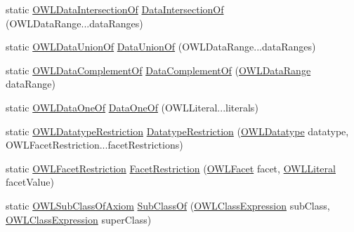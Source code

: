 \begin{DoxyCompactItemize}
\item 
static \hyperlink{interfaceorg_1_1semanticweb_1_1owlapi_1_1model_1_1_o_w_l_data_intersection_of}{O\-W\-L\-Data\-Intersection\-Of} \hyperlink{classorg_1_1semanticweb_1_1owlapi_1_1apibinding_1_1_o_w_l_functional_syntax_factory_a493de259f7d18b8dd7bca58a6ebdad9f}{Data\-Intersection\-Of} (O\-W\-L\-Data\-Range...\-data\-Ranges)
\item 
static \hyperlink{interfaceorg_1_1semanticweb_1_1owlapi_1_1model_1_1_o_w_l_data_union_of}{O\-W\-L\-Data\-Union\-Of} \hyperlink{classorg_1_1semanticweb_1_1owlapi_1_1apibinding_1_1_o_w_l_functional_syntax_factory_abc99421cbe3ad765083e770ebb2152b0}{Data\-Union\-Of} (O\-W\-L\-Data\-Range...\-data\-Ranges)
\item 
static \hyperlink{interfaceorg_1_1semanticweb_1_1owlapi_1_1model_1_1_o_w_l_data_complement_of}{O\-W\-L\-Data\-Complement\-Of} \hyperlink{classorg_1_1semanticweb_1_1owlapi_1_1apibinding_1_1_o_w_l_functional_syntax_factory_a6bcff4150be502475cc7f6391a4bba3e}{Data\-Complement\-Of} (\hyperlink{interfaceorg_1_1semanticweb_1_1owlapi_1_1model_1_1_o_w_l_data_range}{O\-W\-L\-Data\-Range} data\-Range)
\item 
static \hyperlink{interfaceorg_1_1semanticweb_1_1owlapi_1_1model_1_1_o_w_l_data_one_of}{O\-W\-L\-Data\-One\-Of} \hyperlink{classorg_1_1semanticweb_1_1owlapi_1_1apibinding_1_1_o_w_l_functional_syntax_factory_a4fec013de9e968c4f7f9b9556fee89d9}{Data\-One\-Of} (O\-W\-L\-Literal...\-literals)
\item 
static \hyperlink{interfaceorg_1_1semanticweb_1_1owlapi_1_1model_1_1_o_w_l_datatype_restriction}{O\-W\-L\-Datatype\-Restriction} \hyperlink{classorg_1_1semanticweb_1_1owlapi_1_1apibinding_1_1_o_w_l_functional_syntax_factory_a3a28cb41f4e72ca4b650a7330708bd96}{Datatype\-Restriction} (\hyperlink{interfaceorg_1_1semanticweb_1_1owlapi_1_1model_1_1_o_w_l_datatype}{O\-W\-L\-Datatype} datatype, O\-W\-L\-Facet\-Restriction...\-facet\-Restrictions)
\item 
static \hyperlink{interfaceorg_1_1semanticweb_1_1owlapi_1_1model_1_1_o_w_l_facet_restriction}{O\-W\-L\-Facet\-Restriction} \hyperlink{classorg_1_1semanticweb_1_1owlapi_1_1apibinding_1_1_o_w_l_functional_syntax_factory_a2335d1c594ff449d72f9a83d5526d834}{Facet\-Restriction} (\hyperlink{enumorg_1_1semanticweb_1_1owlapi_1_1vocab_1_1_o_w_l_facet}{O\-W\-L\-Facet} facet, \hyperlink{interfaceorg_1_1semanticweb_1_1owlapi_1_1model_1_1_o_w_l_literal}{O\-W\-L\-Literal} facet\-Value)
\item 
static \hyperlink{interfaceorg_1_1semanticweb_1_1owlapi_1_1model_1_1_o_w_l_sub_class_of_axiom}{O\-W\-L\-Sub\-Class\-Of\-Axiom} \hyperlink{classorg_1_1semanticweb_1_1owlapi_1_1apibinding_1_1_o_w_l_functional_syntax_factory_aa06cc216c5b0382769c3231c072a80de}{Sub\-Class\-Of} (\hyperlink{interfaceorg_1_1semanticweb_1_1owlapi_1_1model_1_1_o_w_l_class_expression}{O\-W\-L\-Class\-Expression} sub\-Class, \hyperlink{interfaceorg_1_1semanticweb_1_1owlapi_1_1model_1_1_o_w_l_class_expression}{O\-W\-L\-Class\-Expression} super\-Class)

\end{DoxyCompactItemize}
